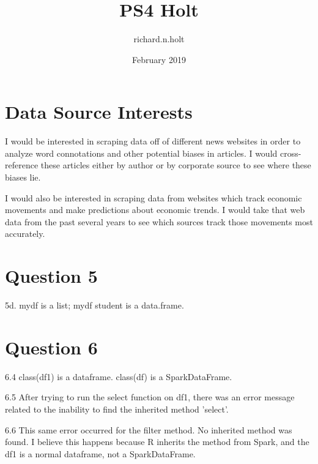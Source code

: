 \documentclass{article}
\title{PS4 Holt}
\author{richard.n.holt}
\date{February 2019}
\begin{document}
\maketitle

\section{Data Source Interests}
I would be interested in scraping data off of different news websites in order to analyze word connotations and other potential biases in articles. I would cross-reference these articles either by author or by corporate source to see where these biases lie.

I would also be interested in scraping data from websites which track economic movements and make predictions about economic trends. I would take that web data from the past several years to see which sources track those movements most accurately.


\section{Question 5}
5d.
mydf is a list; mydf student is a data.frame.

\section{Question 6}
6.4 class(df1) is a dataframe. class(df) is a SparkDataFrame.

6.5 After trying to run the select function on df1, there was an error message related to the inability to find the inherited method 'select'.

6.6 This same error occurred for the filter method. No inherited method was found. I believe this happens because R inherits the method from Spark, and the df1 is a normal dataframe, not a SparkDataFrame.
\end{document}
